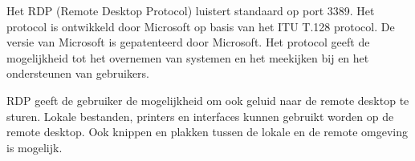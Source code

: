 Het RDP (Remote Desktop Protocol) luistert standaard op port 3389. Het protocol is ontwikkeld door Microsoft op basis van het ITU T.128 protocol. De versie van Microsoft is gepatenteerd door Microsoft. Het protocol geeft de mogelijkheid tot het overnemen van systemen en het meekijken bij en het ondersteunen van gebruikers.

RDP geeft de gebruiker de mogelijkheid om ook geluid naar de remote desktop te sturen. Lokale bestanden, printers en interfaces kunnen gebruikt worden op de remote desktop. Ook knippen en plakken tussen de lokale en de remote omgeving is mogelijk.

